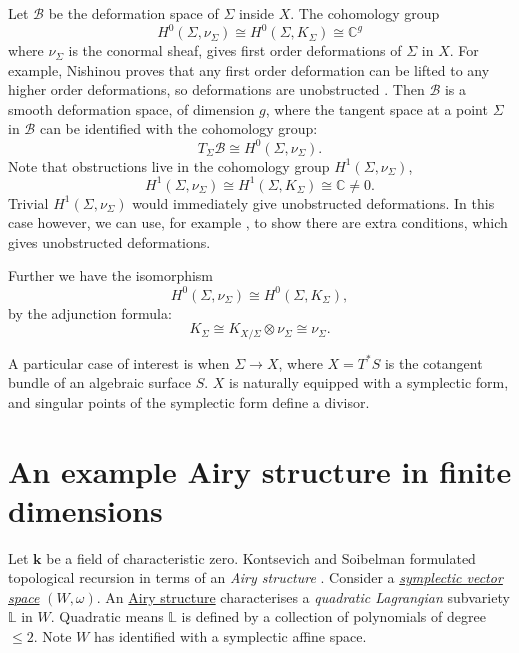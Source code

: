     
    Let \( \mathcal{B}\) be the deformation space of \( \Sigma\) inside \(X\).  The cohomology group \[ H^0(\Sigma, \nu_\Sigma) \cong H^0( \Sigma, K_\Sigma) \cong \mathbb{C}^g \]
    where \( \nu_\Sigma\) is the conormal sheaf, gives first order deformations of \(\Sigma\) in \(X\). For example, Nishinou proves that any first order deformation can be lifted to any higher order deformations, so deformations are unobstructed \cite{nishi_obs}. Then \( \mathcal{B}\) is a smooth deformation space, of dimension \(g\), where the tangent space at a point \(\Sigma\) in \( \mathcal{B}\) can be identified with the cohomology group:
    \[T_\Sigma \mathcal{B} \cong H^0(\Sigma, \nu_\Sigma).\]
    Note that obstructions live in the cohomology group \(H^1(\Sigma, \nu_\Sigma)\),
    \[ H^1( \Sigma ,\nu_\Sigma) \cong H^1(\Sigma, K_\Sigma) \cong \mathbb{C} \neq 0. \]
    Trivial \(H^1(\Sigma ,\nu_\Sigma)\) would immediately give unobstructed deformations. In this case however, we can use, for example \cite{nishi_obs}, to show there are extra conditions, which gives unobstructed deformations.
        
    Further we have the isomorphism 
    \[  H^0(\Sigma, \nu_\Sigma) \cong H^{0}(\Sigma, K_\Sigma),\] 
    by the adjunction formula:
    \[ K_\Sigma \cong K_{X/\Sigma} \otimes \nu_\Sigma \cong \nu_\Sigma. \]
    
    A particular case of interest is when \(\Sigma \rightarrow  X\), where \(X = T^{*}S\) is the cotangent bundle of an algebraic surface \(S\). \(X\) is naturally equipped with a symplectic form, and singular points of the symplectic form define a divisor.



    
    \section{An example Airy structure in finite dimensions}
    \label{sec:finiteexintro}
    Let \( \mathbf{k}\) be a field of characteristic zero. Kontsevich and Soibelman formulated topological recursion in terms of an \emph{Airy structure} \cite{ks_airy, abcd, airy_semisimple, eynard_abc}. Consider a \emph{\hyperref[defn:symplectic]{symplectic vector space}} \((W,\omega)\). An \hyperref[defn:airystruct]{Airy structure} characterises a \emph{quadratic Lagrangian} subvariety \(\mathbb{L}\) in \(W\). Quadratic means \( \mathbb{L}\) is defined by a collection of polynomials of degree \(\leq 2\). Note \(W\) has identified with a symplectic affine space.
    
